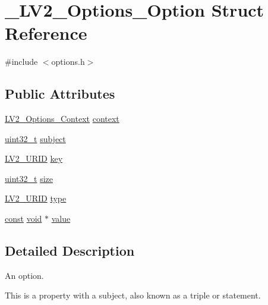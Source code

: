 \hypertarget{struct___l_v2___options___option}{}\section{\+\_\+\+L\+V2\+\_\+\+Options\+\_\+\+Option Struct Reference}
\label{struct___l_v2___options___option}


{\ttfamily \#include $<$options.\+h$>$}

\subsection*{Public Attributes}
\begin{DoxyCompactItemize}
\item 
\hyperlink{lv2_2lv2_2lv2_2lv2plug_8in_2ns_2ext_2options_2options_8h_a5e99cf301490645cbebf1063d2321c40}{L\+V2\+\_\+\+Options\+\_\+\+Context} \hyperlink{struct___l_v2___options___option_a4a7c51a412bd98f3315fc85d8126a098}{context}
\item 
\hyperlink{lib-src_2ffmpeg_2win32_2stdint_8h_a6eb1e68cc391dd753bc8ce896dbb8315}{uint32\+\_\+t} \hyperlink{struct___l_v2___options___option_ac4e61e2cfc81ce5682c6516152860f98}{subject}
\item 
\hyperlink{urid_8h_a5ff0630d245539e9f6dca10ff3c40fae}{L\+V2\+\_\+\+U\+R\+ID} \hyperlink{struct___l_v2___options___option_ad833966cb37c120e0457c95685f37e08}{key}
\item 
\hyperlink{lib-src_2ffmpeg_2win32_2stdint_8h_a6eb1e68cc391dd753bc8ce896dbb8315}{uint32\+\_\+t} \hyperlink{struct___l_v2___options___option_a4ac2d47dde5b32b4ef50984bd2d295d0}{size}
\item 
\hyperlink{urid_8h_a5ff0630d245539e9f6dca10ff3c40fae}{L\+V2\+\_\+\+U\+R\+ID} \hyperlink{struct___l_v2___options___option_a8a86ffd887b16e98fc7d6a67e33c446c}{type}
\item 
\hyperlink{getopt1_8c_a2c212835823e3c54a8ab6d95c652660e}{const} \hyperlink{sound_8c_ae35f5844602719cf66324f4de2a658b3}{void} $\ast$ \hyperlink{struct___l_v2___options___option_a64157bd81b2ddd66ed1248d9a9ca00ba}{value}
\end{DoxyCompactItemize}


\subsection{Detailed Description}
An option.

This is a property with a subject, also known as a triple or statement.

